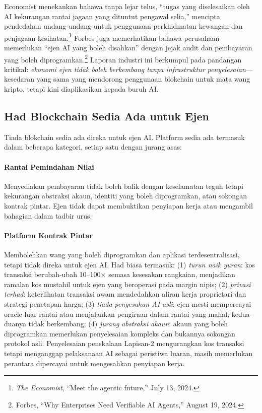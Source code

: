 \documentclass[11pt]{article}
\begin{document}
Economist menekankan bahawa tanpa lejar telus, ``tugas yang diselesaikan oleh AI kekurangan rantai jagaan yang dituntut pengawal selia,'' mencipta pendedahan undang-undang untuk penggunaan perkhidmatan kewangan dan penjagaan kesihatan.\footnote{\emph{The Economist}, ``Meet the agentic future,'' July 13, 2024.} Forbes juga memerhatikan bahawa perusahaan memerlukan ``ejen AI yang boleh disahkan'' dengan jejak audit dan pembayaran yang boleh diprogramkan.\footnote{Forbes, ``Why Enterprises Need Verifiable AI Agents,'' August 19, 2024.} Laporan industri ini berkumpul pada pandangan kritikal: \emph{ekonomi ejen tidak boleh berkembang tanpa infrastruktur penyelesaian}---kesedaran yang sama yang mendorong penggunaan blokchain untuk mata wang kripto, tetapi kini diaplikasikan kepada buruh AI.

\subsection{Had Blockchain Sedia Ada untuk Ejen}
Tiada blokchain sedia ada direka untuk ejen AI. Platform sedia ada termasuk dalam beberapa kategori, setiap satu dengan jurang asas:

\paragraph{Rantai Pemindahan Nilai} Menyediakan pembayaran tidak boleh balik dengan keselamatan teguh tetapi kekurangan abstraksi akaun, identiti yang boleh diprogramkan, atau sokongan kontrak pintar. Ejen tidak dapat membuktikan penyiapan kerja atau mengambil bahagian dalam tadbir urus.

\paragraph{Platform Kontrak Pintar} Membolehkan wang yang boleh diprogramkan dan aplikasi terdesentralisasi, tetapi tidak direka untuk ejen AI. Had biasa termasuk: (1) \emph{turun naik yuran}: kos transaksi berubah-ubah 10--100$\times$ semasa kesesakan rangkaian, menjadikan ramalan kos mustahil untuk ejen yang beroperasi pada margin nipis; (2) \emph{privasi terhad}: keterlihatan transaksi awam mendedahkan aliran kerja proprietari dan strategi penetapan harga; (3) \emph{tiada pengesahan AI asli}: ejen mesti mempercayai oracle luar rantai atau menjalankan pengiraan dalam rantai yang mahal, kedua-duanya tidak berkembang; (4) \emph{jurang abstraksi akaun}: akaun yang boleh diprogramkan memerlukan penyelesaian kompleks dan bukannya sokongan protokol asli. Penyelesaian penskalaan Lapisan-2 mengurangkan kos transaksi tetapi menganggap pelaksanaan AI sebagai peristiwa luaran, masih memerlukan perantara dipercayai untuk mengesahkan penyiapan kerja.
\end{document}
